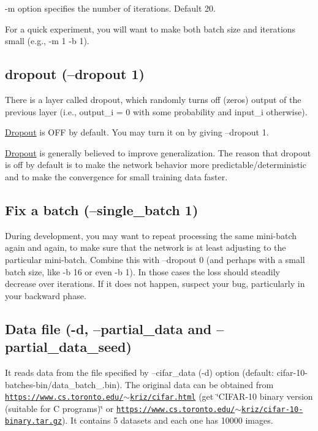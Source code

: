 -\/m option specifies the number of iterations. Default 20.

For a quick experiment, you will want to make both batch size and iterations small (e.\+g., -\/m 1 -\/b 1).

\subsection*{dropout (--dropout 1) }

There is a layer called dropout, which randomly turns off (zeros) output of the previous layer (i.\+e., output\+\_\+i = 0 with some probability and input\+\_\+i otherwise).

\hyperlink{structDropout}{Dropout} is O\+FF by default. You may turn it on by giving --dropout 1.

\hyperlink{structDropout}{Dropout} is generally believed to improve generalization. The reason that dropout is off by default is to make the network behavior more predictable/deterministic and to make the convergence for small training data faster.

\subsection*{Fix a batch (--single\+\_\+batch 1) }

During development, you may want to repeat processing the same mini-\/batch again and again, to make sure that the network is at least adjusting to the particular mini-\/batch. Combine this with --dropout 0 (and perhaps with a small batch size, like -\/b 16 or even -\/b 1). In those cases the loss should steadily decrease over iterations. If it does not happen, suspect your bug, particularly in your backward phase.

\subsection*{Data file (-\/d, --partial\+\_\+data and --partial\+\_\+data\+\_\+seed) }

It reads data from the file specified by --cifar\+\_\+data (-\/d) option (default\+: cifar-\/10-\/batches-\/bin/data\+\_\+batch\+\_.\+bin). The original data can be obtained from \href{https://www.cs.toronto.edu/~kriz/cifar.html}{\tt https\+://www.\+cs.\+toronto.\+edu/$\sim$kriz/cifar.\+html} (get \char`\"{}\+C\+I\+F\+A\+R-\/10 binary version (suitable for C programs)\char`\"{} or \href{https://www.cs.toronto.edu/~kriz/cifar-10-binary.tar.gz}{\tt https\+://www.\+cs.\+toronto.\+edu/$\sim$kriz/cifar-\/10-\/binary.\+tar.\+gz}). It contains 5 datasets and each one has 10000 images.


